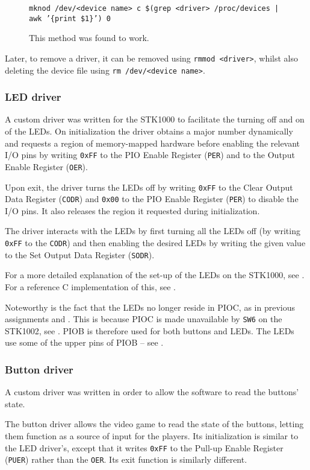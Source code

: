 \begin{figure}[h!]
\texttt{mknod /dev/<device name> c \$(grep <driver> /proc/devices | awk '\{print \$1\}') 0}
\label{fig-drivers}
\caption{This method was found to work.}
\end{figure}

Later, to remove a driver, it can be removed using \texttt{rmmod <driver>}, whilst also deleting the device file using \texttt{rm /dev/<device name>}.

\subsubsection{LED driver}
A custom driver was written for the STK1000 to facilitate the turning off and on of the LEDs.
On initialization the driver obtains a major number dynamically and requests a region of memory-mapped hardware before enabling the relevant I/O pins by writing \texttt{0xFF} to the PIO Enable Register (\texttt{PER}) and to the Output Enable Register (\texttt{OER}).

Upon exit, the driver turns the LEDs off by writing \texttt{0xFF} to the Clear Output Data Register (\texttt{CODR}) and \texttt{0x00} to the PIO Enable Register (\texttt{PER}) to disable the I/O pins.
It also releases the region it requested during initialization.

The driver interacts with the LEDs by first turning all the LEDs off (by writing \texttt{0xFF} to the \texttt{CODR}) and then enabling the desired LEDs by writing the given value to the Set Output Data Register (\texttt{SODR}).

For a more detailed explanation of the set-up of the LEDs on the STK1000, see \cite{tdt4258-1}.
For a reference C implementation of this, see \cite{tdt4258-2}.

Noteworthy is the fact that the LEDs no longer reside in PIOC, as in previous assignments \cite{tdt4258-1} and \cite{tdt4258-2}.
This is because PIOC is made unavailable by \texttt{SW6} on the STK1002, see \cite{lab-compendium}.
PIOB is therefore used for both buttons and LEDs.
The LEDs use some of the upper pins of PIOB -- see \cite{lab-compendium}.

\subsubsection{Button driver}
A custom driver was written in order to allow the software to read the buttons' state.

The button driver allows the video game to read the state of the buttons, letting them function as a source of input for the players.
Its initialization is similar to the LED driver's, except that it writes \texttt{0xFF} to the Pull-up Enable Register (\texttt{PUER}) rather than the \texttt{OER}.
Its exit function is similarly different.

